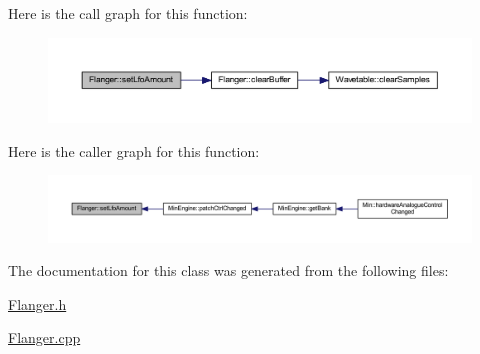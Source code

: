 Here is the call graph for this function\+:
\nopagebreak
\begin{figure}[H]
\begin{center}
\leavevmode
\includegraphics[width=350pt]{class_flanger_a311ea2020c379266da75e57bec0cc5ad_cgraph}
\end{center}
\end{figure}
Here is the caller graph for this function\+:
\nopagebreak
\begin{figure}[H]
\begin{center}
\leavevmode
\includegraphics[width=350pt]{class_flanger_a311ea2020c379266da75e57bec0cc5ad_icgraph}
\end{center}
\end{figure}


The documentation for this class was generated from the following files\+:\begin{DoxyCompactItemize}
\item 
\hyperlink{_flanger_8h}{Flanger.\+h}\item 
\hyperlink{_flanger_8cpp}{Flanger.\+cpp}\end{DoxyCompactItemize}
